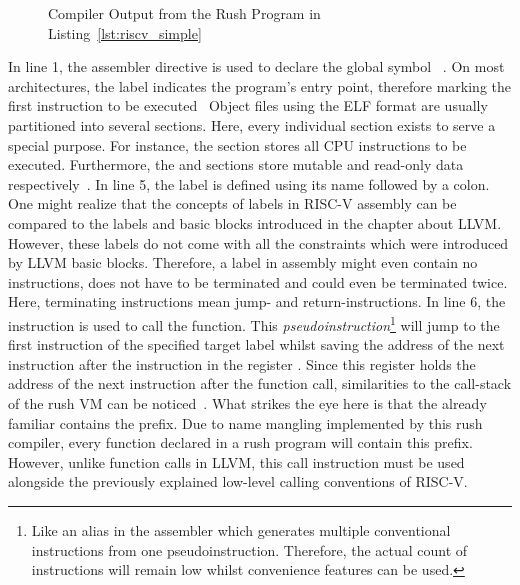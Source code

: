 
\begin{figure}
	\centering
	\caption{Compiler Output from the Rush Program in Listing~\ref{lst:riscv_simple}}\label{lst:riscv_simple_asm}
\end{figure}

In line 1, the  assembler directive is used to declare the global symbol ~\cite[p~.36]{Patterson2017}.
On most architectures, the  label indicates the program's entry point, therefore marking the first instruction to be executed~\cite[p.~19]{Zhirkov2017-wk}
Object files using the ELF format are usually partitioned into several sections.
Here, every individual section exists to serve a special purpose.
For instance, the  section stores all CPU instructions to be executed.
Furthermore, the  and  sections store mutable and read-only data respectively~\cite[p.~76]{Zhirkov2017-wk}.
In line 5, the  label is defined using its name followed by a colon.
One might realize that the concepts of labels in RISC-V assembly can be compared to the labels and basic blocks introduced in the chapter about LLVM\@.
However, these labels do not come with all the constraints which were introduced by LLVM basic blocks.
Therefore, a label in assembly might even contain no instructions, does not have to be terminated and could even be terminated twice.
Here, terminating instructions mean jump- and return-instructions.
In line 6, the  instruction is used to call the  function.
This \emph{pseudoinstruction}\footnote{Like an alias in the assembler which generates multiple conventional instructions from one pseudoinstruction. Therefore, the actual count of instructions will remain low whilst convenience features can be used.} will jump to the first instruction of the specified target label whilst saving the address of the next instruction after the  instruction in the register .
Since this register holds the address of the next instruction after the function call, similarities to the call-stack of the rush VM can be noticed~\cite[p.~22]{Patterson2017}.
What strikes the eye here is that the already familiar  contains the  prefix.
Due to name mangling implemented by this rush compiler, every function declared in a rush program will contain this prefix.
However, unlike function calls in LLVM, this call instruction must be used alongside the previously explained low-level calling conventions of RISC-V.

